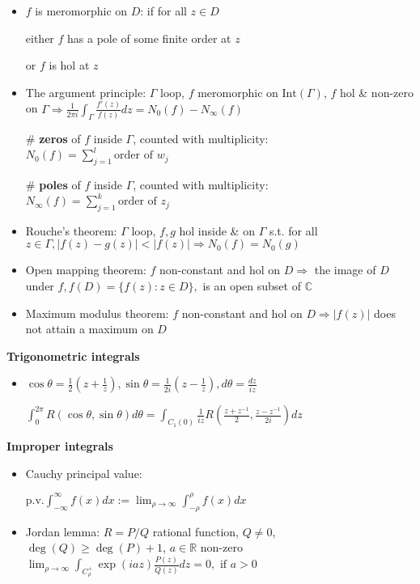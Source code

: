 \documentclass[10pt,a4paper]{article}
\begin{document}
\begin{multicols}{2}
\begin{itemize}
    \item $f$ is meromorphic on $D$: if for all $z\in D$
    
    either $f$ has a pole of some finite order at $z$
    
    or $f$ is hol at $z$
    \item The argument principle: $\Gamma$ loop, $f$ meromorphic on $\text{Int}(\Gamma)$, $f$ hol \& non-zero on $\Gamma \Rightarrow \frac{1}{2\pi i} \int_\Gamma \frac{f'(z)}{f(z)}dz = N_0(f) - N_\infty(f)$
    
    \# \textbf{zeros} of $f$ inside $\Gamma$, counted with multiplicity:   $N_0(f) = \sum_{j=1}^l \text{order of } w_j$ 
      
    \# \textbf{poles} of $f$ inside $\Gamma$, counted with multiplicity: $N_\infty(f) = \sum_{j=1}^k \text{order of } z_j$

    \item Rouche's theorem: $\Gamma$ loop, $f,g$ hol inside \& on $\Gamma$ s.t. for all $z\in \Gamma, |f(z)-g(z)|<|f(z)| \Rightarrow N_0(f)=N_0(g)$
    \item Open mapping theorem: $f$ non-constant and hol on $D \Rightarrow$ the image of $D$ under $f, f(D)=\{ f(z):z\in D \},$ is an open subset of $\mathbb C$
    \item Maximum modulus theorem:  $f$ non-constant and hol on $D \Rightarrow |f(z)|$ does not attain a maximum on $D$
\end{itemize}

\textbf{Trigonometric integrals}

\begin{itemize}
    \item $\cos\theta=\frac{1}{2}(z+\frac{1}{z}), \sin\theta=\frac{1}{2i}(z-\frac{1}{z}), d\theta=\frac{dz}{iz}$
  
  $\int_0^{2\pi} R(\cos \theta, \sin \theta)d\theta= \int_{C_1(0)} \frac{1}{iz} R\left( \frac{z+z^{-1}}{2}, \frac{z-z^{-1}}{2i} \right)dz$
\end{itemize}

\textbf{Improper integrals}

\begin{itemize}
    \item Cauchy principal value: 
    
    $\text{p.v.} \int_{-\infty}^\infty f(x)dx := \lim_{\rho \to \infty} \int_{-\rho}^\rho f(x) dx$

\item Jordan lemma: $R=P/Q$ rational function, $Q \neq 0$, $\deg(Q)\geq \deg(P)+1$, $a\in \mathbb R$ non-zero
  $\lim_{\rho \to \infty} \int_{C_\rho^+}\exp(iaz)\frac{P(z)}{Q(z)}dz=0, \text{ if } a>0$


\end{itemize}
\end{multicols}
\end{document}
